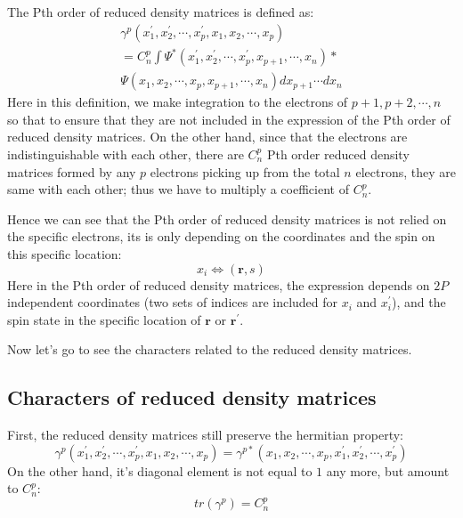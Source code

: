 The Pth order of reduced density matrices is defined as:
\begin{multline}\label{DMeq:2}
  \gamma^{p}(x^{'}_{1}, x^{'}_{2}, \cdots, x^{'}_{p}, x_{1}, x_{2},
  \cdots, x_{p}) \\
  = C^{p}_{n}\int \Psi^{*}(x^{'}_{1}, x^{'}_{2}, \cdots, x^{'}_{p},
  x_{p+1},
  \cdots, x_{n})* \\
  \Psi(x_{1}, x_{2}, \cdots, x_{p}, x_{p+1}, \cdots,
  x_{n})dx_{p+1}\cdots dx_{n}
\end{multline}
Here in this definition, we make integration to the electrons of $p+1,
p+2, \cdots, n$ so that to ensure that they are not included in the
expression of the Pth order of reduced density matrices. On the other
hand, since that the electrons are indistinguishable with each other,
there are $C^{p}_{n}$ Pth order reduced density matrices formed by any
$p$ electrons picking up from the total $n$ electrons, they are same
with each other; thus we have to multiply a coefficient of
$C^{p}_{n}$.

Hence we can see that the Pth order of reduced density matrices is not
relied on the specific electrons, its is only depending on the
coordinates and the spin on this specific location:
\begin{equation}\label{}
  x_{i} \Leftrightarrow (\mathbf{r}, s)
\end{equation}
Here in the Pth order of reduced density matrices, the expression
depends on $2P$ independent coordinates (two sets of indices are
included for $x_{i}$ and $x_{i}^{'}$), and the spin state in the
specific location of $\mathbf{r}$ or $\mathbf{r^{'}}$.

Now let's go to see the characters related to the reduced density
matrices.

\subsection{Characters of reduced density matrices}
%
%
%
First, the reduced density matrices still preserve the hermitian
property:
\begin{equation}\label{}
  \gamma^{p}(x^{'}_{1}, x^{'}_{2}, \cdots, x^{'}_{p}, x_{1}, x_{2},
  \cdots, x_{p}) = \gamma^{p*}(x_{1}, x_{2}, \cdots,
  x_{p},x^{'}_{1}, x^{'}_{2}, \cdots, x^{'}_{p})
\end{equation}
On the other hand, it's diagonal element is not equal to $1$ any more,
but amount to $C^{p}_{n}$:
\begin{equation}\label{}
  tr(\gamma^{p}) = C^{p}_{n}
\end{equation}

